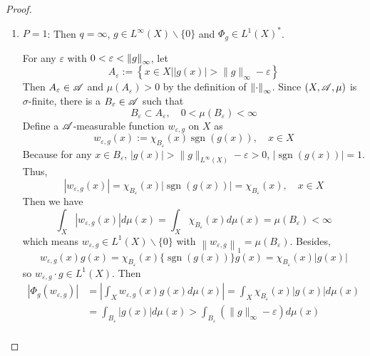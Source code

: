 \begin{proof}
\begin{enumerate}[label=(\roman*)]
		\item $P = 1$: Then $q = \infty$, $g \in L^{\infty}(X) \backslash\{0\}$ and $\Phi_g \in L^1(X)^*$. 

		\noindent For any $\varepsilon$ with $0 < \varepsilon < \left\lVert g\right\lVert_\infty$, let
		\begin{equation*}
			A_{\varepsilon}:=\left\{x \in X| | g(x) \mid>\|g\|_{\infty}-\varepsilon\right\}
		\end{equation*}
		Then $A_{\varepsilon} \in \mathscr{A}$ and $\mu(A_{\varepsilon}) > 0$ by the definition of $\left\lVert\cdot\right\lVert_\infty$. Since $(X,\mathscr{A},\mu)$ is $\sigma$-finite, there is a $B_{\varepsilon} \in \mathscr{A}$ such that
		\begin{equation*}
			B_{\varepsilon} \subset A_{\varepsilon}, \quad 0<\mu\left(B_{\varepsilon}\right)<\infty
		\end{equation*}
		Define a $\mathscr{A}$-measurable function $w_{\varepsilon,g}$ on $X$ as
		\begin{equation*}
			w_{\varepsilon, g}(x):=\chi_{B_{\varepsilon}}(x) \operatorname{sgn}(g(x)),\quad x \in X
		\end{equation*}
		Because for any $x \in B_{\varepsilon}$, $|g(x)|>\|g\|_{L^{\infty}(X)}-\varepsilon>0$, $|\operatorname{sgn}(g(x))|=1$. Thus,
		\begin{equation*}
			\left|w_{\varepsilon, g}(x)\right|=\chi_{B_{\varepsilon}}(x)|\operatorname{sgn}(g(x))|=\chi_{B_{\varepsilon}}(x),\quad x \in X
		\end{equation*}
		Then we have
		\begin{equation*}
			\int_X\left|w_{\varepsilon, g}(x)\right| d \mu(x)=\int_X \chi_{B_{\varepsilon}}(x) d \mu(x)=\mu\left(B_{\varepsilon}\right)<\infty
		\end{equation*}
		which means $w_{\varepsilon, g} \in L^1(X) \backslash\{0\}$ with $\left\|w_{\varepsilon, g}\right\|_{1}=\mu\left(B_{\varepsilon}\right)$. Besides,
		\begin{equation*}
			w_{\varepsilon, g}(x) g(x)=\chi_{B_{\varepsilon}}(x)\{\operatorname{sgn}(g(x))\} g(x)=\chi_{B_{\varepsilon}}(x)|g(x)|
		\end{equation*}
		so $w_{\varepsilon, g} \cdot g \in L^1(X)$. Then
		\begin{equation*}
			\begin{aligned}
				\left|\Phi_g\left(w_{\varepsilon, g}\right)\right| & =\left|\int_X w_{\varepsilon, g}(x) g(x) d \mu(x)\right|=\int_X \chi_{B_{\varepsilon}}(x)|g(x)| d \mu(x) \\
				& =\int_{B_{\varepsilon}}|g(x)| d \mu(x)>\int_{B_{\varepsilon}}\left(\|g\|_{\infty}-\varepsilon\right) d \mu(x) \\

\end{aligned}
\end{equation*}
\end{enumerate}
\end{proof}
